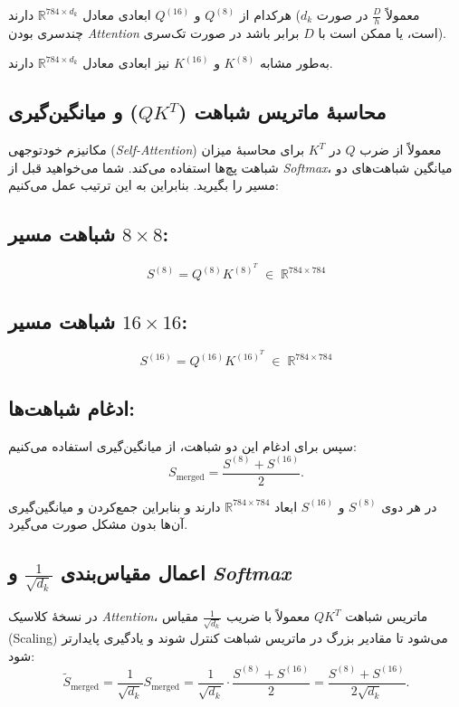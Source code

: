 هرکدام از \(Q^{(8)}\) و \(Q^{(16)}\) ابعادی معادل \(\mathbb{R}^{784 \times d_k}\) دارند (\(d_k\) معمولاً \(\frac{D}{h}\) در صورت چندسری بودن \textit{Attention} است، یا ممکن است با \(D\) برابر باشد در صورت تک‌سری).

به‌طور مشابه \(K^{(8)}\) و \(K^{(16)}\) نیز ابعادی معادل \(\mathbb{R}^{784 \times d_k}\) دارند.

\subsection{محاسبهٔ ماتریس شباهت (\(QK^T\)) و میانگین‌گیری}

مکانیزم خودتوجهی (\textit{Self-Attention}) معمولاً از ضرب \(Q\) در \(K^T\) برای محاسبهٔ میزان شباهت پچ‌ها استفاده می‌کند. شما می‌خواهید قبل از \textit{Softmax}، میانگین شباهت‌های دو مسیر را بگیرید. بنابراین به این ترتیب عمل می‌کنیم:

\subsection*{شباهت مسیر $8 \times 8$:}
\[
S^{(8)} = Q^{(8)} K^{(8)^T} \; \in \; \mathbb{R}^{784 \times 784}
\]

\subsection*{شباهت مسیر $16 \times 16$:}
\[
S^{(16)} = Q^{(16)} K^{(16)^T} \; \in \; \mathbb{R}^{784 \times 784}
\]

\subsection*{ادغام شباهت‌ها:}
سپس برای ادغام این دو شباهت، از میانگین‌گیری استفاده می‌کنیم:
\[
S_{\text{merged}} = \frac{S^{(8)} + S^{(16)}}{2}.
\]

در هر دوی \(S^{(8)}\) و \(S^{(16)}\) ابعاد \(\mathbb{R}^{784 \times 784}\) دارند و بنابراین جمع‌کردن و میانگین‌گیری آن‌ها بدون مشکل صورت می‌گیرد.

\subsection{اعمال مقیاس‌بندی \( \frac{1}{\sqrt{d_k}} \) و  \textit{Softmax}}

در نسخهٔ کلاسیک \textit{Attention}، ماتریس شباهت \( QK^T \) معمولاً با ضریب \( \frac{1}{\sqrt{d_k}} \) مقیاس (Scaling) می‌شود تا مقادیر بزرگ در ماتریس شباهت کنترل شوند و یادگیری پایدارتر شود:
\[
\tilde{S}_{\text{merged}} = \frac{1}{\sqrt{d_k}} S_{\text{merged}} = \frac{1}{\sqrt{d_k}} \cdot \frac{S^{(8)} + S^{(16)}}{2} = \frac{S^{(8)} + S^{(16)}}{2 \sqrt{d_k}}.
\]

